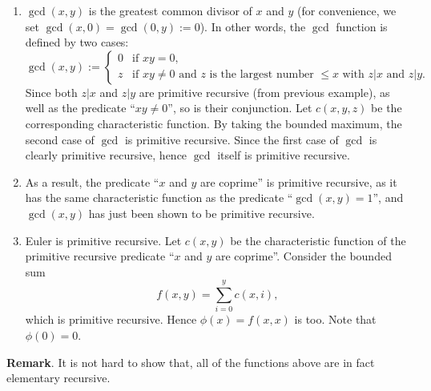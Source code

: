 \documentclass[12pt]{article}
\begin{document}
\begin{enumerate}
\item $\operatorname{gcd}(x,y)$ is the greatest common divisor of $x$ and $y$ (for convenience, we set $\operatorname{gcd}(x,0)=\operatorname{gcd}(0,y):=0$).  In other words, the $\operatorname{gcd}$ function is defined by two cases:
\begin{displaymath}
\operatorname{gcd}(x,y) := \left\{
\begin{array}{ll}
0 & \textrm{if } xy=0, \\
z & \textrm{if } xy\ne 0 \mbox{ and }z \mbox{ is the largest number }\!\!\le x\mbox{ with }z|x\mbox{ and }z|y.
\end{array}
\right.
\end{displaymath}
Since both $z|x$ and $z|y$ are primitive recursive (from previous example), as well as the predicate ``$xy\ne 0$'', so is their conjunction.  Let $c(x,y,z)$ be the corresponding characteristic function.  By taking the bounded maximum, the second case of $\operatorname{gcd}$ is primitive recursive.  Since the first case of $\operatorname{gcd}$ is clearly primitive recursive, hence $\operatorname{gcd}$ itself is primitive recursive.
\item As a result, the predicate ``$x$ and $y$ are coprime'' is primitive recursive, as it has the same characteristic function as the predicate ``$\operatorname{gcd}(x,y)=1$'', and $\operatorname{gcd}(x,y)$ has just been shown to be primitive recursive.
\item Euler  is primitive recursive.  Let $c(x,y)$ be the characteristic function of the primitive recursive predicate ``$x$ and $y$ are coprime''.  Consider the bounded sum
$$f(x,y) = \sum_{i=0}^y c(x,i),$$
which is primitive recursive.  Hence $\phi(x)=f(x,x)$ is too.  Note that $\phi(0)=0$.
\end{enumerate}

\textbf{Remark}.  It is not hard to show that, all of the functions above are in fact elementary recursive.
\end{document}
